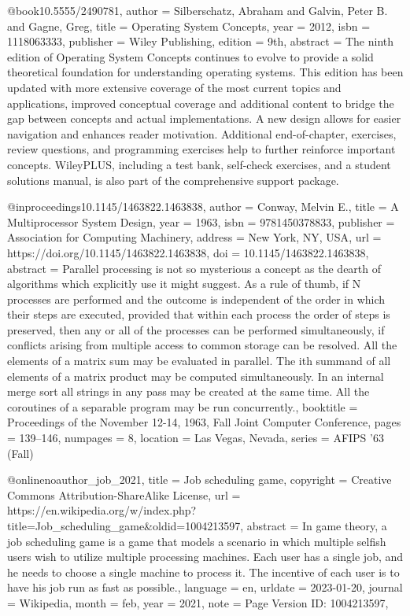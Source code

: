 @book{10.5555/2490781,
author = {Silberschatz, Abraham and Galvin, Peter B. and Gagne, Greg},
title = {Operating System Concepts},
year = {2012},
isbn = {1118063333},
publisher = {Wiley Publishing},
edition = {9th},
abstract = {The ninth edition of Operating System Concepts continues to evolve to provide a solid theoretical foundation for understanding operating systems. This edition has been updated with more extensive coverage of the most current topics and applications, improved conceptual coverage and additional content to bridge the gap between concepts and actual implementations. A new design allows for easier navigation and enhances reader motivation. Additional end-of-chapter, exercises, review questions, and programming exercises help to further reinforce important concepts. WileyPLUS, including a test bank, self-check exercises, and a student solutions manual, is also part of the comprehensive support package.}
}

@inproceedings{10.1145/1463822.1463838,
author = {Conway, Melvin E.},
title = {A Multiprocessor System Design},
year = {1963},
isbn = {9781450378833},
publisher = {Association for Computing Machinery},
address = {New York, NY, USA},
url = {https://doi.org/10.1145/1463822.1463838},
doi = {10.1145/1463822.1463838},
abstract = {Parallel processing is not so mysterious a concept as the dearth of algorithms which explicitly use it might suggest. As a rule of thumb, if N processes are performed and the outcome is independent of the order in which their steps are executed, provided that within each process the order of steps is preserved, then any or all of the processes can be performed simultaneously, if conflicts arising from multiple access to common storage can be resolved. All the elements of a matrix sum may be evaluated in parallel. The ith summand of all elements of a matrix product may be computed simultaneously. In an internal merge sort all strings in any pass may be created at the same time. All the coroutines of a separable program may be run concurrently.},
booktitle = {Proceedings of the November 12-14, 1963, Fall Joint Computer Conference},
pages = {139–146},
numpages = {8},
location = {Las Vegas, Nevada},
series = {AFIPS '63 (Fall)}
}

@online{noauthor_job_2021,
	title = {Job scheduling game},
	copyright = {Creative Commons Attribution-ShareAlike License},
	url = {https://en.wikipedia.org/w/index.php?title=Job_scheduling_game&oldid=1004213597},
	abstract = {In game theory, a job scheduling game is a game that models a scenario in which multiple selfish users wish to utilize multiple processing machines. Each user has a single job, and he needs to choose a single machine to process it. The incentive of each user is to have his job run as fast as possible.},
	language = {en},
	urldate = {2023-01-20},
	journal = {Wikipedia},
	month = feb,
	year = {2021},
	note = {Page Version ID: 1004213597},
}


